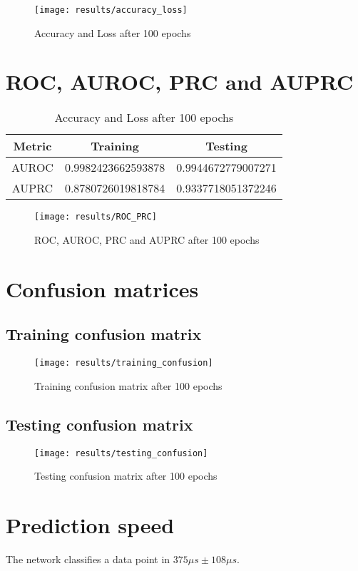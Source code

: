 \begin{figure}
	\texttt{[image: results/accuracy\_loss]}
	\caption{Accuracy and Loss after 100 epochs}
\end{figure}

\section{ROC, AUROC, PRC and AUPRC}
\begin{table}
	\begin{tabular}{|c|c|c|}
		\hline
		\textbf{Metric} & \textbf{Training}  & \textbf{Testing}   \\
		\hline
		AUROC           & 0.9982423662593878 & 0.9944672779007271 \\
		\hline
		AUPRC           & 0.8780726019818784 & 0.9337718051372246 \\
		\hline
	\end{tabular}
	\caption{Accuracy and Loss after 100 epochs}
\end{table}

\begin{figure}
	\texttt{[image: results/ROC\_PRC]}
	\caption{ROC, AUROC, PRC and AUPRC after 100 epochs}
\end{figure}

\section{Confusion matrices}

\subsection{Training confusion matrix}
\begin{figure}
	\texttt{[image: results/training\_confusion]}
	\caption{Training confusion matrix after 100 epochs}
\end{figure}

\subsection{Testing confusion matrix}
\begin{figure}
	\texttt{[image: results/testing\_confusion]}
	\caption{Testing confusion matrix after 100 epochs}
\end{figure}

\section{Prediction speed}
The network classifies a data point in \(375 \mu s \pm 108 \mu s\).

